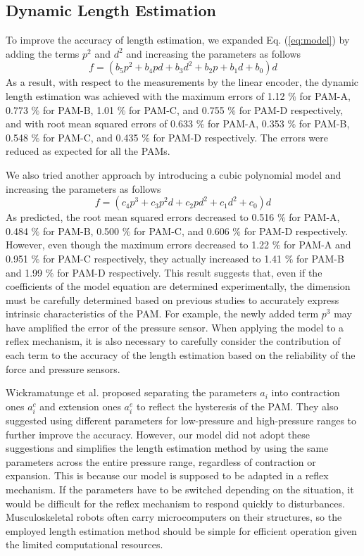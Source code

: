 \renewcommand{\thesubsection}{\Alph{subsection}}
\setcounter{subsection}{1} 
\subsection{Dynamic Length Estimation}
To improve the accuracy of length estimation, we expanded Eq. (\ref{eq:model}) by adding the terms $p^2$ and $d^2$ and increasing the parameters as follows
\begin{equation}
\label{eq:model_2d(1)}
f = (b_5p^2 + b_4pd + b_3d^2 + b_2p+b_1d+b_0)d
\end{equation}
As a result, with respect to the measurements by the linear encoder, the dynamic length estimation was achieved with the maximum errors of 1.12 $\%$ for PAM-A, 0.773 $\%$ for PAM-B, 1.01 $\%$ for PAM-C, and 0.755 $\%$ for PAM-D respectively, and with root mean squared errors of 0.633 $\%$ for PAM-A, 0.353 $\%$ for PAM-B, 0.548 $\%$ for PAM-C, and 0.435 $\%$ for PAM-D respectively. The errors were reduced as expected for all the PAMs. 

We also tried another approach by introducing a cubic polynomial model and increasing the parameters as follows
\begin{equation}
    \label{eq:model_3d}
    f = (c_4p^3+c_3p^2d+c_2pd^2+c_1d^2+c_0)d
\end{equation}
As predicted, the root mean squared errors decreased to 0.516 $\%$ for PAM-A, 0.484 $\%$ for PAM-B, 0.500 $\%$ for PAM-C, and 0.606 $\%$ for PAM-D respectively. 
However, even though the maximum errors decreased to 1.22 $\%$ for PAM-A and 0.951 $\%$ for PAM-C respectively, they actually increased to 1.41 $\%$ for PAM-B and 1.99 $\%$ for PAM-D respectively. This result suggests that, even if the coefficients of the model equation are determined experimentally, the dimension must be carefully determined based on previous studies to accurately express intrinsic characteristics of the PAM. For example, the newly added term $p^3$ may have amplified the error of the pressure sensor. When applying the model to a reflex mechanism, it is also necessary to carefully consider the contribution of each term to the accuracy of the length estimation based on the reliability of the force and pressure sensors.

Wickramatunge et al. proposed separating the parameters $a_i$ into contraction ones $a^c_i$ and extension ones $a^e_i$ to reflect the hysteresis of the PAM\cite{spring}. They also suggested using different parameters for low-pressure and high-pressure ranges to further improve the accuracy. However, our model did not adopt these suggestions and simplifies the length estimation method by using the same parameters across the entire pressure range, regardless of contraction or expansion. This is because our model is supposed to be adapted in a reflex mechanism. If the parameters have to be switched depending on the situation, it would be difficult for the reflex mechanism to respond quickly to disturbances. Musculoskeletal robots often carry microcomputers on their structures, so the employed length estimation method should be simple for efficient operation given the limited computational resources.

